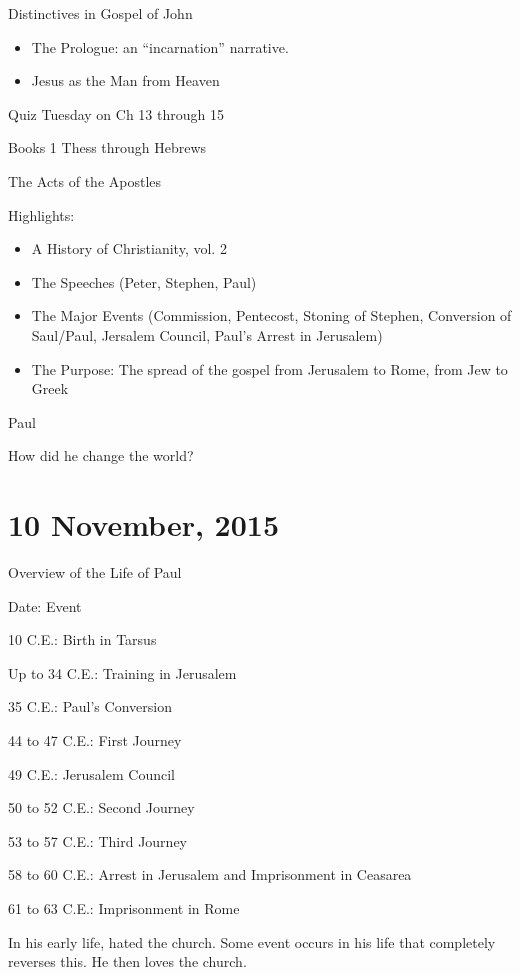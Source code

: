 \documentclass{article}
\begin{document}
    Distinctives in Gospel of John

    \begin{itemize}
        \item The Prologue: an ``incarnation'' narrative.
        \item Jesus as the Man from Heaven
    \end{itemize}

    Quiz Tuesday on Ch 13 through 15

    Books 1 Thess through Hebrews

    \centerline{The Acts of the Apostles}

    Highlights:

    \begin{itemize}
        \item A History of Christianity, vol. 2
        \item The Speeches (Peter, Stephen, Paul)
        \item The Major Events (Commission, Pentecost, Stoning of Stephen, Conversion of Saul/Paul, Jersalem Council, Paul's Arrest in Jerusalem)
        \item The Purpose: The spread of the gospel from Jerusalem to Rome, from Jew to Greek
    \end{itemize}

    \centerline{Paul}

    How did he change the world?

    \section{10 November, 2015}

    \centerline{Overview of the Life of Paul}

    Date: Event

    10 C.E.: Birth in Tarsus

    Up to 34 C.E.: Training in Jerusalem

    35 C.E.: Paul's Conversion

    44 to 47 C.E.: First Journey

    49 C.E.: Jerusalem Council

    50 to 52 C.E.: Second Journey

    53 to 57 C.E.: Third Journey

    58 to 60 C.E.: Arrest in Jerusalem and Imprisonment in Ceasarea

    61 to 63 C.E.: Imprisonment in Rome

    In his early life, hated the church. Some event occurs in his life that completely reverses this. He then loves the church.
\end{document}
